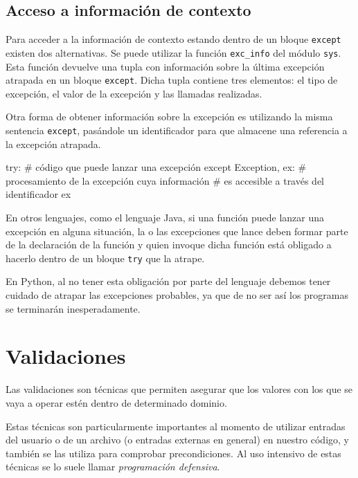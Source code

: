 \subsection{Acceso a información de contexto}

Para acceder a la información de contexto estando dentro de un bloque
\lstinline!except!  existen dos alternativas. Se puede utilizar la función
\lstinline!exc_info!  del módulo \lstinline!sys!. Esta función devuelve una
tupla con información sobre la última excepción atrapada en un bloque
\lstinline!except!. Dicha tupla contiene tres elementos: el tipo de
excepción, el valor de la excepción y las llamadas realizadas.

Otra forma de obtener información sobre la excepción es utilizando la
misma sentencia \lstinline!except!, pasándole un identificador para que
almacene una referencia a la excepción atrapada.

\begin{codigo-python-sn}
try:
	# código que puede lanzar una excepción
except Exception, ex:
	# procesamiento de la excepción cuya información
	# es accesible a través del identificador ex
\end{codigo-python-sn}


\begin{sabias_que}
En otros lenguajes, como el lenguaje Java, si una función puede lanzar una
excepción en alguna situación, la o las excepciones que lance deben formar
parte de la declaración de la función y quien invoque dicha función está
obligado a hacerlo dentro de un bloque \lstinline!try! que la atrape.

En Python, al no tener esta obligación por parte del lenguaje debemos tener
cuidado de atrapar las excepciones probables, ya que de no ser así los
programas se terminarán inesperadamente.
\end{sabias_que}

\section{Validaciones}

Las validaciones son técnicas que permiten asegurar que los valores con los
que se vaya a operar estén dentro de determinado dominio.

Estas técnicas son particularmente importantes al momento de utilizar entradas
del usuario o de un archivo (o entradas externas en general) en nuestro
código, y también se las utiliza para comprobar precondiciones. Al
uso intensivo de estas técnicas se lo suele llamar {\it programación
defensiva}.

